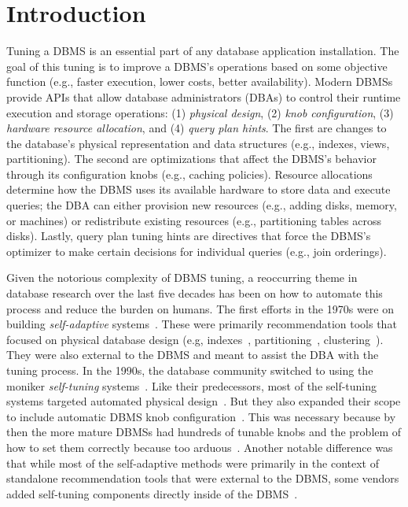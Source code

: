 \documentclass[11pt,times]{article}
\begin{document}
\section{Introduction}
\label{sec:introduction}
Tuning a DBMS is an essential part of any database application 
installation. The goal of this tuning is to improve a DBMS's operations based on some 
objective function (e.g., faster execution, lower costs, better availability). Modern DBMSs provide 
APIs that allow database administrators (DBAs) to control their runtime execution and storage
operations: (1) \textit{physical design}, (2) \textit{knob configuration}, (3) \textit{hardware 
resource allocation}, and (4) \textit{query plan hints}. The first are changes to the database's 
physical representation and data structures 
(e.g., indexes, views, partitioning). The second are optimizations that 
affect the DBMS's behavior through its configuration knobs (e.g., caching policies).
Resource allocations determine how the DBMS uses its available hardware to store data and execute 
queries; the DBA can either provision new resources (e.g., adding disks, 
memory, or machines) or redistribute existing resources (e.g., partitioning tables across 
disks). Lastly, query plan 
tuning hints are directives that force the DBMS's optimizer to make certain decisions 
for individual queries (e.g., join orderings).

Given the notorious complexity of DBMS tuning, a reoccurring theme in 
database research over the last five decades has been on how to automate this process and reduce 
the burden on humans.
The first efforts in the 1970s were on building \textit{self-adaptive} systems~\cite{hammer77}. 
These were primarily recommendation tools that focused on physical database design (e.g, 
indexes~\cite{hammer76,hudson89}, partitioning~\cite{hammer79,levin82}, clustering~\cite{yu85}). 
They were also external to the DBMS and meant to assist the DBA with the tuning process.
In the 1990s, the database community switched to using the moniker \textit{self-tuning} 
systems~\cite{chaudhuri07,weikum94}. Like their predecessors, most of the self-tuning systems 
targeted automated physical design~\cite{gupta97,chaudhuri97,valentin00}. But they also expanded 
their scope to include automatic DBMS knob configuration~\cite{sullivan04,debnath08,tian03}. 
This was necessary because by then the more mature DBMSs had hundreds of tunable 
knobs and the problem of how to set them correctly because too arduous~\cite{vanaken17}.
Another notable difference was that while most of the self-adaptive methods were primarily in 
the context of standalone recommendation 
tools that were external to the DBMS, some vendors added self-tuning components 
directly inside of the DBMS~\cite{kwan02,storm06,dageville02}.
\end{document}
